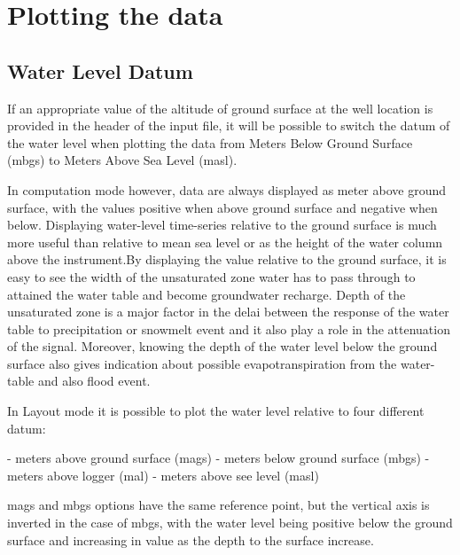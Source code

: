 \documentclass[WHATMANUAL.tex]{subfiles}
\begin{document}
\chapter{Plotting the data}

\section{Water Level Datum}

If an appropriate value of the altitude of ground surface at the well location is provided in the header of the input file, it will be possible to switch the datum of the water level when plotting the data from Meters Below Ground Surface (mbgs) to Meters Above Sea Level (masl).

In computation mode however, data are always displayed as meter above ground surface, with the values positive when above ground surface and negative when below. Displaying water-level time-series relative to the ground surface is much more useful than relative to mean sea level or as the height of the water column above the instrument.By displaying the value relative to the ground surface, it is easy to see the width of the unsaturated zone water has to pass through to attained the water table and become groundwater recharge. Depth of the unsaturated zone is a major factor in the delai between the response of the water table to precipitation or snowmelt event and it also play a role in the attenuation of the signal. Moreover, knowing the depth of the water level below the ground surface also gives indication about possible evapotranspiration from the water-table and also flood event.

In Layout mode it is possible to plot the water level relative to four different datum:

- meters above ground surface (mags)
- meters below ground surface (mbgs)
- meters above logger (mal)
- meters above see level (masl)

mags and mbgs options have the same reference point, but the vertical axis is inverted in the case of mbgs, with the water level being positive below the ground surface and increasing in value as the depth to the surface increase.
\end{document}
